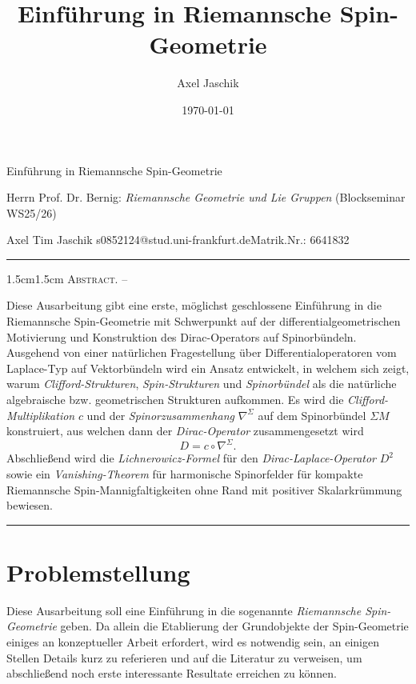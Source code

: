 \documentclass[10pt, letterpaper]{article}
\title{Einführung in Riemannsche Spin-Geometrie}
\author{Axel Jaschik}
\date{\today}
\renewenvironment{abstract}
  {
    \begin{adjustwidth}{1.5cm}{1.5cm}
    \small
    \textsc{Abstract. –}%
  }
  {
    \end{adjustwidth}
  }
\begin{document}
\begin{center}
    \Large{Einführung in Riemannsche Spin-Geometrie}\\[10pt]
\end{center}
\vspace{0.05cm}

\begin{center}
     {Herrn Prof. Dr. Bernig: \textit{Riemannsche Geometrie und Lie Gruppen} (Blockseminar WS25/26)}\\
\end{center}


\begin{center}
    \footnotesize{Axel Tim Jaschik \qquad s0852124@stud.uni-frankfurt.de\qquad Matrik.Nr.: 6641832}
\end{center}

\rule{\textwidth}{0.5pt}
\begin{abstract}
Diese Ausarbeitung gibt eine erste, möglichst geschlossene Einführung in die Riemannsche Spin-Geometrie mit Schwerpunkt auf der differentialgeometrischen Motivierung und Konstruktion des Dirac-Operators auf Spinorbündeln. Ausgehend von einer natürlichen Fragestellung über Differentialoperatoren vom Laplace-Typ auf Vektorbündeln wird ein Ansatz entwickelt, in welchem sich zeigt, warum \emph{Clifford-Strukturen}, \emph{Spin-Strukturen} und \emph{Spinorbündel} als die natürliche algebraische bzw. geometrischen Strukturen aufkommen. Es wird die \emph{Clifford-Multiplikation} $c$ und der \emph{Spinorzusammenhang} $\nabla^\Sigma$ auf dem Spinorbündel $\Sigma M$ konstruiert, aus welchen dann der \emph{Dirac-Operator} zusammengesetzt wird
$$D=c\circ \nabla^\Sigma.$$ 
Abschließend wird die \emph{Lichnerowicz-Formel} für den \emph{Dirac-Laplace-Operator} $D^2$ sowie ein \emph{Vanishing-Theorem} für harmonische Spinorfelder für kompakte Riemannsche Spin-Mannigfaltigkeiten ohne Rand mit positiver Skalarkrümmung bewiesen.
\end{abstract}
\rule{\textwidth}{0.5pt}



\tableofcontents


\vspace{0.8cm}


\section{Problemstellung}

Diese Ausarbeitung soll eine Einführung in die sogenannte \emph{Riemannsche Spin-Geometrie} geben. Da allein die Etablierung der Grundobjekte der Spin-Geometrie einiges an konzeptueller Arbeit erfordert, wird es notwendig sein, an einigen Stellen Details kurz zu referieren und auf die Literatur zu verweisen, um abschließend noch erste interessante Resultate erreichen zu können. 
\end{document}

